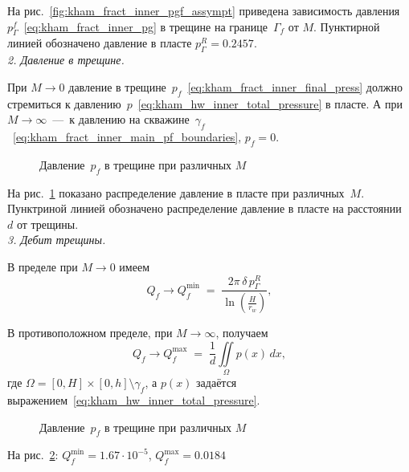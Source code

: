 \documentclass{article}
\begin{document}
На рис.~\ref{fig:kham_fract_inner_pgf_assympt} приведена зависимость 
давления~$p_{\Gamma}^f$~\eqref{eq:kham_fract_inner_pg} 
в трещине на границе~$\Gamma_f$ от $M$. Пунктирной линией обозначено давление в пласте $p_{\Gamma}^R = 0.2457$. \\


\textit{ 2. Давление в трещине.}

При $M \to 0$ давление в трещине~$p_f$~\eqref{eq:kham_fract_inner_final_press} должно стремиться 
к давлению~$p$~\eqref{eq:kham_hw_inner_total_pressure} в пласте. А при $M \to \infty$~---~к давлению на 
скважине~$\gamma_f$~\eqref{eq:kham_fract_inner_main_pf_boundaries}, $p_f = 0$.

\begin{figure}[H]
	\centering
	
	\caption{Давление~$p_f$ в трещине при различных $M$}
	\label{fig:kham_fract_inner_pf_assympt}
\end{figure}

На рис.~\ref{fig:kham_fract_inner_pf_assympt} показано распределение давление в пласте при различных~$M$. 
Пунктриной линией обозначено распределение давление в пласте на расстоянии~$d$ от трещины. \\

\textit{ 3. Дебит трещины.}

В пределе при $M \to 0$ имеем
\begin{equation}
	Q_f \to Q_f^{\min} \;=\; \frac{2 \pi \, \delta \, p_{\Gamma}^R}{ \ln\left(\tfrac{H}{r_w}\right)},
	\label{eq:kham_fract_inner_Qf_min_asympt}
\end{equation}

В противоположном пределе, при $M \to \infty$, получаем
\begin{equation}
	Q_f \to Q_f^{\max} \;=\; \frac{1}{d} \iint\limits_{\Omega} p(x)\, dx, 
	\label{eq:kham_fract_inner_Qf_max_asympt}
\end{equation}
где $\Omega = [0,H]\times[0,h] \setminus \gamma_f$, а $p(x)$ 
задаётся выражением~\eqref{eq:kham_hw_inner_total_pressure}.

\begin{figure}[H]
	\centering
	
	\caption{Давление~$p_f$ в трещине при различных $M$}
	\label{fig:kham_fract_inner_qf_assympt}
\end{figure}

На рис.~\ref{fig:kham_fract_inner_qf_assympt}: $Q_f^{\min}=1.67\cdot10^{-5}$, $Q_f^{\max}=0.0184$
\end{document}
